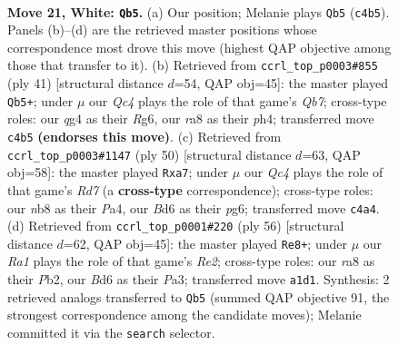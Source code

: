 \documentclass[11pt]{article}
\begin{document}
\clearpage

\begin{figure}[p]\centering
\begin{subfigure}{0.46\textwidth}\centering
\resizebox{\linewidth}{!}{%
\newchessgame
\chessboard[
  setfen={rn4k1/p4p1p/3B2p1/8/2Q1r1q1/8/P4P1P/R6K w - - 0 21},
  showmover=false,
  pgfstyle=straightmove, color=movearrow, markmove={c4-b5}
]}
\caption{}
\end{subfigure}\hfill
\begin{subfigure}{0.46\textwidth}\centering
\resizebox{\linewidth}{!}{%
\newchessgame
\chessboard[
  setfen={r3k3/pp3p2/6r1/7p/7P/4P3/Pq1QKPP1/R6R b q - 1 21},
  showmover=false,
  pgfstyle=straightmove, color=movearrow, markmove={b2-b5}
]}
\caption{}
\end{subfigure}
\\[4pt]
\begin{subfigure}{0.46\textwidth}\centering
\resizebox{\linewidth}{!}{%
\newchessgame
\chessboard[
  setfen={4r1k1/p2R1r1p/1p4p1/2pQ4/P4q2/7P/1PP3P1/R5K1 w - - 2 26},
  showmover=false,
  pgfstyle=straightmove, color=movearrow, markmove={d7-a7}
]}
\caption{}
\end{subfigure}\hfill
\begin{subfigure}{0.46\textwidth}\centering
\resizebox{\linewidth}{!}{%
\newchessgame
\chessboard[
  setfen={1Q1q2k1/1pr2p2/6p1/3r3p/8/P5P1/KPP1R2P/8 w - - 2 29},
  showmover=false,
  pgfstyle=straightmove, color=movearrow, markmove={e2-e8}
]}
\caption{}
\end{subfigure}
\caption{\textbf{Move 21, White: \texttt{Qb5}.} (a) Our position; Melanie plays \texttt{Qb5} (\texttt{c4b5}). Panels (b)--(d) are the retrieved master positions whose correspondence most drove this move (highest QAP objective among those that transfer to it). (b) Retrieved from \texttt{ccrl\_top\_p0003\#855} (ply 41) [structural distance $d$=54, QAP obj=45]: the master played \texttt{Qb5+}; under $\mu$ our \emph{Qc4} plays the role of that game's \emph{Qb7}; cross-type roles: our \emph{q}g4 as their \emph{R}g6, our \emph{r}a8 as their \emph{p}h4; transferred move \texttt{c4b5} \textbf{(endorses this move)}. (c) Retrieved from \texttt{ccrl\_top\_p0003\#1147} (ply 50) [structural distance $d$=63, QAP obj=58]: the master played \texttt{Rxa7}; under $\mu$ our \emph{Qc4} plays the role of that game's \emph{Rd7} (a \textbf{cross-type} correspondence); cross-type roles: our \emph{n}b8 as their \emph{P}a4, our \emph{B}d6 as their \emph{p}g6; transferred move \texttt{c4a4}. (d) Retrieved from \texttt{ccrl\_top\_p0001\#220} (ply 56) [structural distance $d$=62, QAP obj=45]: the master played \texttt{Re8+}; under $\mu$ our \emph{Ra1} plays the role of that game's \emph{Re2}; cross-type roles: our \emph{r}a8 as their \emph{P}b2, our \emph{B}d6 as their \emph{P}a3; transferred move \texttt{a1d1}. Synthesis: 2 retrieved analogs transferred to \texttt{Qb5} (summed QAP objective 91, the strongest correspondence among the candidate moves); Melanie committed it via the \texttt{search} selector.}
\label{fig:thought-m40}
\end{figure}
\end{document}
